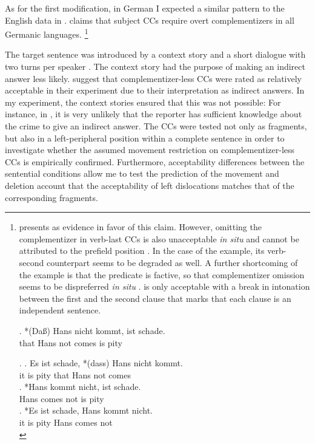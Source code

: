 \noindent As for the first modification, in German I expected a similar pattern to the English data in \citet{merchant.etal2013}. \citet[83]{webelhuth1992} claims that subject CCs require overt complementizers in all Germanic languages.%
%
\footnote{\citeauthor{webelhuth1992} presents \Next as evidence in favor of this claim. However, omitting the complementizer in verb-last CCs is also unacceptable \textit{in situ} and cannot be attributed to the prefield position \NNext[a]. In the case of the example, its verb-second counterpart \NNext[b] seems to be degraded as well. A further shortcoming of the example is that the predicate is factive, so that complementizer omission seems to be dispreferred \textit{in situ} \NNext[c]. \NNext[c] is only acceptable with a break in intonation between the first and the second clause that marks that each clause is an independent sentence.

\exg. *(Da\ss) Hans nicht kommt, ist schade.\\
that Hans not comes is pity\\

\ex. \ag. Es ist schade, *(dass) Hans nicht kommt.\\
	  it is pity that Hans not comes\\
     \bg. *Hans kommt nicht, ist schade.\\
	  Hans comes not is pity\\
    \cg.  *Es ist schade, Hans kommt nicht.\\
	  it is  pity Hans comes not\\


}\afterfn %

The target sentence was introduced by a context story and a short dialogue with two turns per speaker \Next. The context story had the purpose of making an indirect answer less likely. \citet{merchant.etal2013} suggest that complementizer-less CCs were rated as relatively acceptable in their experiment due to their interpretation as indirect answers. In my experiment, the context stories ensured that this was not possible: For instance, in \Next, it is very unlikely that the reporter has sufficient knowledge about the crime to give an indirect answer. The CCs were tested not only as fragments, but also in a left-peripheral position within a complete sentence in order to investigate whether the assumed movement restriction on complementizer-less CCs is empirically confirmed. Furthermore, acceptability differences between the sentential conditions allow me to test the prediction of the movement and deletion account that the acceptability of left dislocations matches that of the corresponding fragments.

